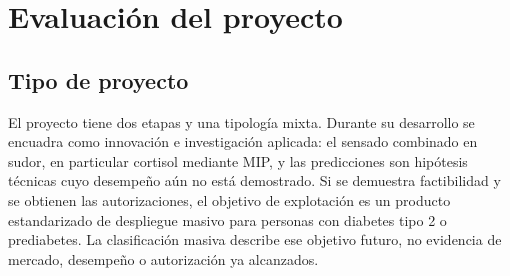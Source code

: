 \section{Evaluación del proyecto}





\subsection{Tipo de proyecto}





El proyecto tiene dos etapas y una tipología mixta. Durante su desarrollo se encuadra como innovación e investigación aplicada: el sensado combinado en sudor, en particular cortisol mediante MIP, y las predicciones son hipótesis técnicas cuyo desempeño aún no está demostrado. Si se demuestra factibilidad y se obtienen las autorizaciones, el objetivo de explotación es un producto estandarizado de despliegue masivo para personas con diabetes tipo 2 o prediabetes. La clasificación masiva describe ese objetivo futuro, no evidencia de mercado, desempeño o autorización ya alcanzados.

